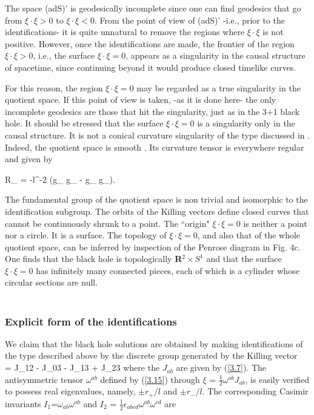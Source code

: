 The space (adS)' is geodesically incomplete since one can find
geodesics that go from $\xi \cdot \xi >0$ to  $\xi \cdot
\xi <0$.  From the point of view of (adS)' -i.e., prior to the
identifications- it is quite unnatural to remove the regions
where  $\xi \cdot \xi$ is not positive. However, once the
identifications are made, the frontier of the region $\xi \cdot
\xi >0$, i.e., the surface $\xi \cdot \xi =0$, appears as a
singularity in the causal structure of spacetime, since
continuing beyond it would produce closed timelike curves.

For this reason, the region $\xi \cdot \xi =0$ may be
regarded as a true singularity in the quotient space. If this
point of view is taken, -as it is done here- the only incomplete
geodesics are those that hit the singularity, just as in the 3+1
black hole. It should be stressed that the surface $\xi \cdot
\xi =0$ is a singularity only in the causal structure. It is not
a conical curvature singularity of the type discussed in
\cite{7}.  Indeed, the quotient space is  smooth \cite{8}.  Its
curvature tensor is everywhere regular and given by

\bb
R_{\mu \nu \lambda \rho} = -l^{-2} (g_{\mu \lambda} g_{\nu \rho}
- g_{\nu \lambda} g_{\mu \rho}).
\ee

The fundamental group of the quotient space is non trivial and
isomorphic to the identification subgroup.  The orbits of the
Killing vectors define closed curves that cannot be continuously
shrunk to a point. The  ``origin"  $\xi \cdot \xi=0$ is neither a
point nor a circle. It is a surface. The topology of $\xi \cdot
\xi =0$, and also that of the whole quotient space, can be
inferred by inspection of the Penrose diagram in Fig. 4c.  One
finds that the black hole is topologically {\bf R}$^2 \times
S^1$ and that the surface $\xi \cdot \xi=0$ has infinitely many
connected pieces, each of which is a cylinder whose circular
sections are null.  \\
\\

\subsubsection{Explicit form of the identifications}
%
We claim that the black hole solutions are obtained by making
identifications of the type described above by the discrete
group generated by the Killing vector
\\
\bb
\xi = J_{12} - J_{03} - J_{13} + J_{23}
\label{3.15}
\ee
%
where the $J_{ab}$ are given by (\ref{3.7}). The antisymmetric
tensor $\omega^{ab}$ defined by (\ref{3.15}) through $\xi$ =
$\frac{1}{2} \omega^{ab} J_{ab}$,  is easily verified to possess
real eigenvalues, namely, $ \pm r_{+}/l$ and $\pm r_{-}/l$. The
corresponding Casimir invariants $I_1 $=$ \omega_{a b} \omega^{a
b}$ and $I_2$ = $\frac{1}{2}\epsilon _{a b c d} \omega^{a b}
\omega^{cd}$ are

